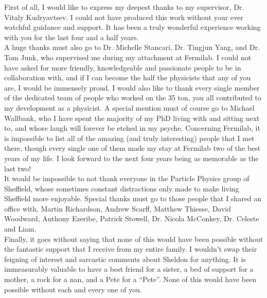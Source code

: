 
\begin{acknowledgements}      

  First of all, I would like to express my deepest thanks to my supervisor, Dr. Vitaly Kudryavtsev. I could not have produced this work without your ever watchful guidance and support. It has been a truly wonderful experience working with you for the last four and a half years. \\
  
  A huge thanks must also go to Dr. Michelle Stancari, Dr. Tingjun Yang, and Dr. Tom Junk, who supervised me during my attachment at Fermilab. I could not have asked for more friendly, knowledgeable and passionate people to be in collaboration with, and if I can become the half the physicists that any of you are, I would be immensely proud. I would also like to thank every single member of the dedicated team of people who worked on the 35 ton, you all contributed to my development as a physicist. A special mention must of course go to Michael Wallbank, who I have spent the majority of my PhD living with and sitting next to, and whose laugh will forever be etched in my psyche. Concerning Fermilab, it is impossible to list all of the amazing (and truly interesting) people that I met there, though every single one of them made my stay at Fermilab two of the best years of my life. I look forward to the next four years being as memorable as the last two! \\

  It would be impossible to not thank everyone in the Particle Physics group of Sheffield, whose sometimes constant distractions only made to make living Sheffield more enjoyable. Special thanks must go to those people that I shared an office with, Martin Richardson, Andrew Scarff, Matthew Thiesse, David Woodward, Anthony Ezeribe, Patrick Stowell, Dr. Nicola McConkey, Dr. Celeste and Liam. \\

  Finally, it goes without saying that none of this would have been possible without the fantastic support that I receive from my entire family. I wouldn't swap their feigning of interest and sarcastic comments about Sheldon for anything. It is immeasurably valuable to have a best friend for a sister, a bed of support for a mother, a rock for a nan, and a Pete for a ``Pete''. None of this would have been possible without each and every one of you. \\

\end{acknowledgements}
